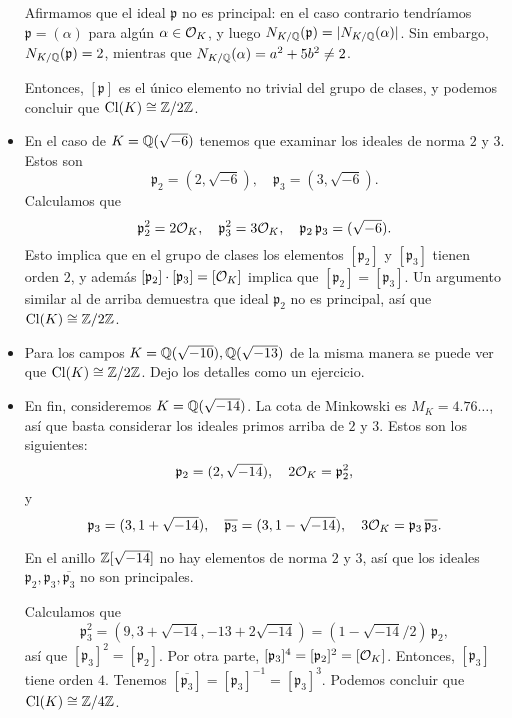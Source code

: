 \begin{ejemplo}
\begin{itemize}
    Afirmamos que el ideal $\mathfrak{p}$ no es principal: en el caso contrario
    tendríamos $\mathfrak{p} = (\alpha)$ para algún $\alpha \in \mathcal{O}_K$,
    y luego $N_{K/\mathbb{Q}} (\mathfrak{p}) = |N_{K/\mathbb{Q}} (\alpha)|$. Sin embargo,
    $N_{K/\mathbb{Q}} (\mathfrak{p}) = 2$, mientras que
    $N_{K/\mathbb{Q}} (\alpha) = a^2 + 5b^2 \ne 2$.

    Entonces, $[\mathfrak{p}]$ es el único elemento no trivial del grupo de
    clases, y podemos concluir que $\operatorname{Cl} (K) \cong \mathbb{Z}/2\mathbb{Z}$.

  \item En el caso de $K = \mathbb{Q} (\sqrt{-6})$ tenemos que examinar los ideales de
    norma $2$ y $3$. Estos son
    $$\mathfrak{p}_2 = (2, \sqrt{-6}), \quad \mathfrak{p}_3 = (3, \sqrt{-6}).$$
    Calculamos que
    \[ \mathfrak{p}_2^2 = 2\mathcal{O}_K, \quad
       \mathfrak{p}_3^2 = 3\mathcal{O}_K, \quad
       \mathfrak{p}_2\,\mathfrak{p}_3 = (\sqrt{-6}). \]
    Esto implica que en el grupo de clases los elementos $[\mathfrak{p}_2]$
    y $[\mathfrak{p}_3]$ tienen orden $2$, y además
    $[\mathfrak{p}_2]\cdot [\mathfrak{p}_3] = [\mathcal{O}_K]$ implica que    
    $[\mathfrak{p}_2] = [\mathfrak{p}_3]$. Un argumento similar al de arriba
    demuestra que ideal $\mathfrak{p}_2$ no es principal, así que
    $\operatorname{Cl} (K) \cong \mathbb{Z}/2\mathbb{Z}$.

  \item Para los campos $K = \mathbb{Q} (\sqrt{-10}), \mathbb{Q} (\sqrt{-13})$ de la misma
    manera se puede ver que $\operatorname{Cl} (K) \cong \mathbb{Z}/2\mathbb{Z}$. Dejo los detalles como
    un ejercicio.

  \item En fin, consideremos $K = \mathbb{Q} (\sqrt{-14})$. La cota de Minkowski es
    $M_K = 4.76\ldots$, así que basta considerar los ideales primos arriba de $2$
    y $3$. Estos son los siguientes:
    $$\mathfrak{p}_2 = (2, \sqrt{-14}), \quad 2\mathcal{O}_K = \mathfrak{p}_2^2,$$
    y
    \[ \mathfrak{p}_3 = (3, 1 + \sqrt{-14}), \quad
       \overline{\mathfrak{p}_3} = (3, 1 - \sqrt{-14}), \quad
       3\mathcal{O}_K = \mathfrak{p}_3\,\overline{\mathfrak{p}_3}. \]

    En el anillo $\mathbb{Z} [\sqrt{-14}]$ no hay elementos de norma $2$ y $3$, así que
    los ideales $\mathfrak{p}_2, \mathfrak{p}_3, \overline{\mathfrak{p}_3}$ no
    son principales.

    Calculamos que
    \[ \mathfrak{p}_3^2 = (9, 3 + \sqrt{-14}, -13 + 2\sqrt{-14}) =
       (1 - \sqrt{-14}/2) \, \mathfrak{p}_2, \]
    así que $[\mathfrak{p}_3]^2 = [\mathfrak{p}_2]$. Por otra parte,
    $[\mathfrak{p}_3]^4 = [\mathfrak{p}_2]^2 = [\mathcal{O}_K]$. Entonces,
    $[\mathfrak{p}_3]$ tiene orden $4$. Tenemos
    $[\overline{\mathfrak{p}_3}] = [\mathfrak{p}_3]^{-1} = [\mathfrak{p}_3]^3$.
    Podemos concluir que $\operatorname{Cl} (K) \cong \mathbb{Z}/4\mathbb{Z}$. \qedhere
  \end{itemize}
\end{ejemplo}

